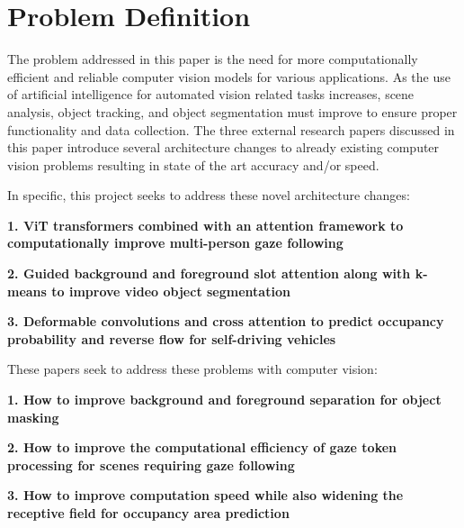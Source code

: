 \documentclass{article}
\theoremstyle{plain}
\theoremstyle{definition}
\theoremstyle{remark}
\begin{document}
\section*{Problem Definition}

\hspace{20pt} The problem addressed in this paper is the need for more computationally efficient and reliable computer vision models for various applications. As the use of artificial intelligence for automated vision related tasks increases, scene analysis, object tracking, and object segmentation must improve to ensure proper functionality and data collection. The three external research papers discussed in this paper introduce several architecture changes to already existing computer vision problems resulting in state of the art accuracy and/or speed. 

In specific, this project seeks to address these novel architecture changes:

\textbf{1.	ViT transformers combined with an attention framework to computationally improve multi-person gaze following}

\textbf{2.	Guided background and foreground slot attention along with k-means to improve video object segmentation}

\textbf{3.	Deformable convolutions and cross attention to predict occupancy probability and reverse flow for self-driving vehicles}

These papers seek to address these problems with computer vision:

\textbf{1.	How to improve background and foreground separation for object masking}

\textbf{2.	How to improve the computational efficiency of gaze token processing for scenes requiring gaze following}

\textbf{3.	How to improve computation speed while also widening the receptive field for occupancy area prediction}
\end{document}
